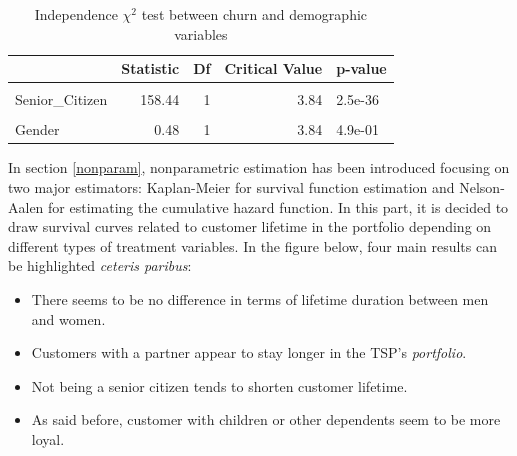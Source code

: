\documentclass[
]{book}
\providecommand{\tightlist}{%
  \setlength{\itemsep}{0pt}\setlength{\parskip}{0pt}}
\begin{document}
\begin{table}[H]

\caption{\label{tab:chi2demographics}Independence $\chi^2$ test between churn and demographic variables}
\centering
\begin{tabular}[t]{lrrrl}
\toprule
  & Statistic & Df & Critical Value & p-value\\
\midrule
\cellcolor{gray!6}{Dependents} & \cellcolor{gray!6}{431.65} & \cellcolor{gray!6}{1} & \cellcolor{gray!6}{3.84} & \cellcolor{gray!6}{7.1e-96}\\
Senior\_Citizen & 158.44 & 1 & 3.84 & 2.5e-36\\
\cellcolor{gray!6}{Partner} & \cellcolor{gray!6}{157.50} & \cellcolor{gray!6}{1} & \cellcolor{gray!6}{3.84} & \cellcolor{gray!6}{4e-36}\\
Gender & 0.48 & 1 & 3.84 & 4.9e-01\\
\bottomrule
\end{tabular}
\end{table}

In section \ref{nonparam}, nonparametric estimation has been introduced focusing on two major estimators: Kaplan-Meier for survival function estimation and Nelson-Aalen for estimating the cumulative hazard function. In this part, it is decided to draw survival curves related to customer lifetime in the portfolio depending on different types of treatment variables. In the figure below, four main results can be highlighted \emph{ceteris paribus}:

\begin{itemize}
\tightlist
\item
  There seems to be no difference in terms of lifetime duration between men and women.
\item
  Customers with a partner appear to stay longer in the TSP's \emph{portfolio}.
\item
  Not being a senior citizen tends to shorten customer lifetime.
\item
  As said before, customer with children or other dependents seem to be more loyal.
\end{itemize}
\end{document}
